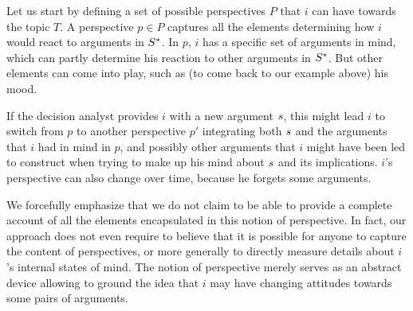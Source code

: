 \documentclass[smallextended,nospthms, natbib]{svjour3}
\begin{document}
Let us start by defining a set of possible perspectives $P$ that $i$ can have towards the topic $T$. A perspective $p \in P$ captures all the elements determining how $i$ would react to arguments in $S^*$. In $p$, $i$ has a specific set of arguments in mind, which can partly determine his reaction to other arguments in $S^*$. But other elements can come into play, such as (to come back to our example above) his mood. 

If the decision analyst provides $i$ with a new argument $s$, this might lead $i$ to switch from $p$ to another perspective $p'$ integrating both $s$ and the arguments that $i$ had in mind in $p$, and possibly other arguments that $i$ might have been led to construct when trying to make up his mind about $s$ and its implications. $i$'s perspective can also change over time, because he forgets some arguments.

We forcefully emphasize that we do not claim to be able to provide a complete account of all the elements encapsulated in this notion of perspective. In fact, our approach does not even require to believe that it is possible for anyone to capture the content of perspectives, or more generally to directly measure details about $i$'s internal states of mind. The notion of perspective merely serves as an abstract device allowing to ground the idea that $i$ may have changing attitudes towards some pairs of arguments.
\end{document}
